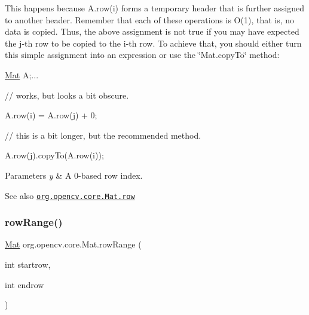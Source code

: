 {\ttfamily }

{\ttfamily This happens because {\ttfamily A.\+row(i)} forms a temporary header that is further assigned to another header. Remember that each of these operations is O(1), that is, no data is copied. Thus, the above assignment is not true if you may have expected the j-\/th row to be copied to the i-\/th row. To achieve that, you should either turn this simple assignment into an expression or use the \char`\"{}\+Mat.\+copy\+To\char`\"{} method\+:}

{\ttfamily }

{\ttfamily }

{\ttfamily \mbox{\hyperlink{classorg_1_1opencv_1_1core_1_1_mat}{Mat}} A;...}

{\ttfamily }

{\ttfamily }

{\ttfamily // works, but looks a bit obscure.}

{\ttfamily }

{\ttfamily }

{\ttfamily A.\+row(i) = A.\+row(j) + 0;}

{\ttfamily }

{\ttfamily }

{\ttfamily // this is a bit longer, but the recommended method.}

{\ttfamily }

{\ttfamily }

{\ttfamily A.\+row(j).copy\+To(A.\+row(i));}

{\ttfamily }

{\ttfamily 
\begin{DoxyParams}{Parameters}
{\em y} & A 0-\/based row index.\\
\hline
\end{DoxyParams}
\begin{DoxySeeAlso}{See also}
\href{http://docs.opencv.org/modules/core/doc/basic_structures.html#mat-row}{\tt org.\+opencv.\+core.\+Mat.\+row} 
\end{DoxySeeAlso}
}\mbox{\label{classorg_1_1opencv_1_1core_1_1_mat_a182dbb37bbaa19e65cfcb99cf4d03fbe}} 
\subsubsection{\texorpdfstring{row\+Range()}{rowRange()}\hspace{0.1cm}{\footnotesize\ttfamily [1/2]}}
{\footnotesize\ttfamily \mbox{\hyperlink{classorg_1_1opencv_1_1core_1_1_mat}{Mat}} org.\+opencv.\+core.\+Mat.\+row\+Range (\begin{DoxyParamCaption}\item[{int}]{startrow,  }\item[{int}]{endrow }\end{DoxyParamCaption})}

